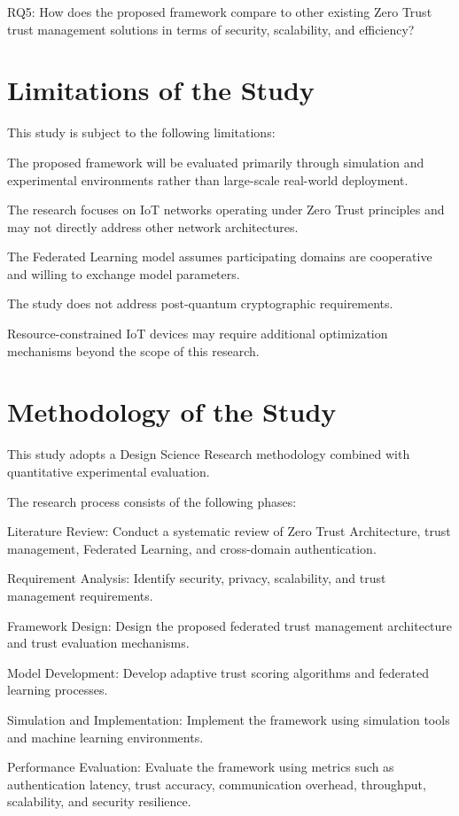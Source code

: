RQ5: How does the proposed framework compare to other existing Zero Trust trust management solutions in terms of security, scalability, and efficiency?


\section{Limitations of the Study}

This study is subject to the following limitations:


The proposed framework will be evaluated primarily through simulation and experimental environments rather than large-scale real-world deployment.


The research focuses on IoT networks operating under Zero Trust principles and may not directly address other network architectures.


The Federated Learning model assumes participating domains are cooperative and willing to exchange model parameters.


The study does not address post-quantum cryptographic requirements.


Resource-constrained IoT devices may require additional optimization mechanisms beyond the scope of this research.


\section{Methodology of the Study}

This study adopts a Design Science Research methodology combined with quantitative experimental evaluation.


The research process consists of the following phases:


Literature Review: Conduct a systematic review of Zero Trust Architecture, trust management, Federated Learning, and cross-domain authentication.


Requirement Analysis: Identify security, privacy, scalability, and trust management requirements.


Framework Design: Design the proposed federated trust management architecture and trust evaluation mechanisms.


Model Development: Develop adaptive trust scoring algorithms and federated learning processes.


Simulation and Implementation: Implement the framework using simulation tools and machine learning environments.


Performance Evaluation: Evaluate the framework using metrics such as authentication latency, trust accuracy, communication overhead, throughput, scalability, and security resilience.


